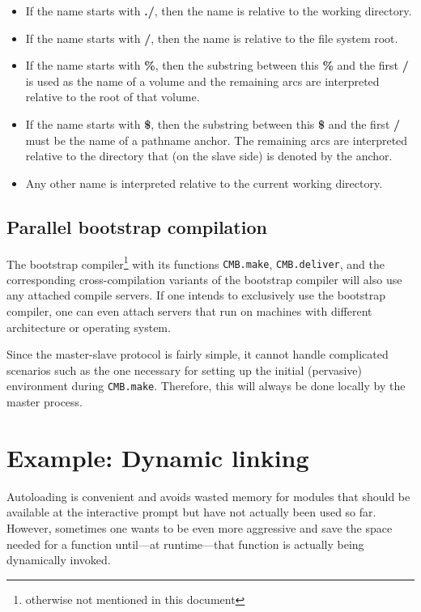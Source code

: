 \documentclass{article}
\begin{document}
\begin{itemize}
\item If the name starts with {\bf ./}, then the name is relative to
the working directory.
\item If the name starts with {\bf /}, then the name is relative to
the file system root.
\item If the name starts with {\bf \%}, then the substring between this
{\bf \%} and the first {\bf /} is used as the name of a volume and the
remaining arcs are interpreted relative to the root of that volume.
\item If the name starts with {\bf \$}, then the substring between
this {\bf \$} and the first {\bf /} must be the name of a pathname
anchor.  The remaining arcs are interpreted relative to the directory
that (on the slave side) is denoted by the anchor.
\item Any other name is interpreted relative to the current working
directory.
\end{itemize}

\subsection{Parallel bootstrap compilation}

The bootstrap compiler\footnote{otherwise not mentioned in this
document} with its functions {\tt CMB.make}, {\tt CMB.deliver}, and
the corresponding cross-compilation variants of the bootstrap compiler
will also use any attached compile servers.  If one intends to
exclusively use the bootstrap compiler, one can even attach servers
that run on machines with different architecture or operating system.

Since the master-slave protocol is fairly simple, it cannot handle
complicated scenarios such as the one necessary for setting up the
initial (pervasive) environment during {\tt CMB.make}.  Therefore,
this will always be done locally by the master process.

\section{Example: Dynamic linking}
\label{sec:dynlink}

Autoloading is convenient and avoids wasted memory for modules that
should be available at the interactive prompt but have not actually
been used so far.  However, sometimes one wants to be even more
aggressive and save the space needed for a function until---at
runtime---that function is actually being dynamically invoked.
\end{document}
